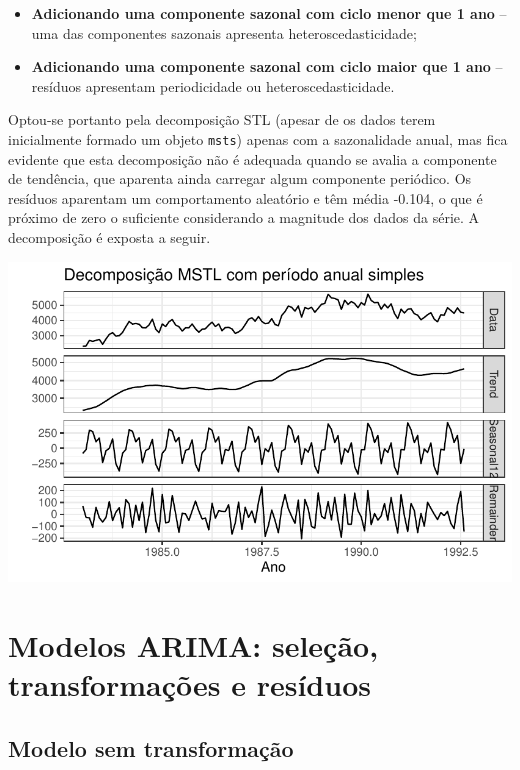 \documentclass[
  letterpaper,
  DIV=11,
  numbers=noendperiod]{scrartcl}
\providecommand{\tightlist}{%
  \setlength{\itemsep}{0pt}\setlength{\parskip}{0pt}}\usepackage{longtable,booktabs,array}
\begin{document}
\begin{itemize}
\tightlist
\item
  \textbf{Adicionando uma componente sazonal com ciclo menor que 1 ano}
  -- uma das componentes sazonais apresenta heteroscedasticidade;
\item
  \textbf{Adicionando uma componente sazonal com ciclo maior que 1 ano}
  -- resíduos apresentam periodicidade ou heteroscedasticidade.
\end{itemize}

Optou-se portanto pela decomposição STL (apesar de os dados terem
inicialmente formado um objeto \texttt{msts}) apenas com a sazonalidade
anual, mas fica evidente que esta decomposição não é adequada quando se
avalia a componente de tendência, que aparenta ainda carregar algum
componente periódico. Os resíduos aparentam um comportamento aleatório e
têm média -0.104, o que é próximo de zero o suficiente considerando a
magnitude dos dados da série. A decomposição é exposta a seguir.

\includegraphics{T2_grupo5_files/figure-pdf/grafico-mstl-1.pdf}

\hypertarget{modelos-arima-seleuxe7uxe3o-transformauxe7uxf5es-e-resuxedduos}{%
\section{Modelos ARIMA: seleção, transformações e
resíduos}\label{modelos-arima-seleuxe7uxe3o-transformauxe7uxf5es-e-resuxedduos}}

\hypertarget{modelo-sem-transformauxe7uxe3o}{%
\subsection{Modelo sem
transformação}\label{modelo-sem-transformauxe7uxe3o}}
\end{document}
